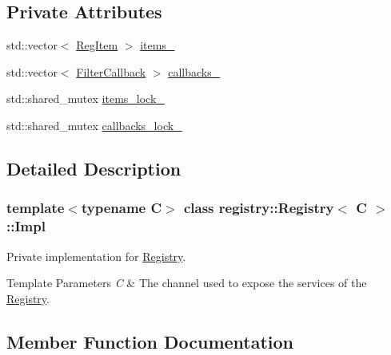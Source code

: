 \subsection*{Private Attributes}
\begin{DoxyCompactItemize}
\item 
std\+::vector$<$ \hyperlink{classregistry_1_1RegItem}{Reg\+Item} $>$ \hyperlink{classregistry_1_1Registry_1_1Impl_a889b38b4e83271cf0b2f5dd0b7443754}{items\+\_\+}
\item 
std\+::vector$<$ \hyperlink{classregistry_1_1AbstractRegistry_a31f6bef634dcd324efebaf55f99b950f}{Filter\+Callback} $>$ \hyperlink{classregistry_1_1Registry_1_1Impl_ad808df523ce751861dbffbfcbe0bec86}{callbacks\+\_\+}
\item 
std\+::shared\+\_\+mutex \hyperlink{classregistry_1_1Registry_1_1Impl_a42ed4f996eacf243c2b6d3703363fc13}{items\+\_\+lock\+\_\+}
\item 
std\+::shared\+\_\+mutex \hyperlink{classregistry_1_1Registry_1_1Impl_a50a02d7a61ab99d3dcdb8440db8e9b48}{callbacks\+\_\+lock\+\_\+}
\end{DoxyCompactItemize}


\subsection{Detailed Description}
\subsubsection*{template$<$typename C$>$\newline
class registry\+::\+Registry$<$ C $>$\+::\+Impl}

Private implementation for \hyperlink{classregistry_1_1Registry}{Registry}. 


\begin{DoxyTemplParams}{Template Parameters}
{\em C} & The channel used to expose the services of the \hyperlink{classregistry_1_1Registry}{Registry}. \\
\hline
\end{DoxyTemplParams}


\subsection{Member Function Documentation}
\mbox{\label{classregistry_1_1Registry_1_1Impl_aef2278274443ae542fd42609fee58e2f}} 
